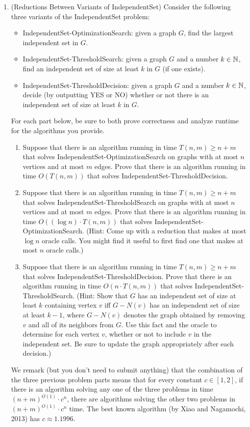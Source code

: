 \documentclass[11pt]{article}
\begin{document}
\begin{enumerate}
\begin{enumerate}
  \end{enumerate}

 \item (Reductions Between Variants of IndependentSet) 
 Consider the following three variants of the IndependentSet problem:
 \begin{itemize}
     \item IndependentSet-OptimizationSearch: given a graph $G$, find the largest independent set in $G$.
     \item IndependentSet-ThresholdSearch: given a graph $G$ and a number $k\in \mathbb{N}$, find an independent set of size at least $k$ in $G$ (if one exists).
     \item IndependentSet-ThresholdDecision: given a graph $G$ and a number $k\in \mathbb{N}$, decide (by outputting YES or NO) whether or not there is an independent set of size at least $k$ in $G$. 
 \end{itemize}
For each part below, be sure to both prove correctness and analyze runtime for the algorithms you provide.

 \begin{enumerate}
 \item Suppose that there is an algorithm running in time $T(n,m)\geq n+m$ that solves IndependentSet-OptimizationSearch on graphs with at most $n$ vertices and at most $m$ edges.  Prove that there is an algorithm running in time $O(T(n,m))$ that solves IndependentSet-ThresholdDecision. 
 \item Suppose that there is an algorithm running in time $T(n,m)\geq n+m$ that solves IndependentSet-ThresholdSearch on graphs with at most $n$ vertices and at most $m$ edges.  Prove that there is an algorithm running in time $O((\log n)\cdot T(n,m))$ that solves IndependentSet-OptimizationSearch.  (Hint: Come up with a reduction that makes at most $\log n$ oracle calls.  You might find it useful to first find one that makes at most $n$ oracle calls.)
  \item Suppose that there is an algorithm 
 running in time $T(n,m)\geq n+m$ that solves IndependentSet-ThresholdDecision.   Prove that there is an algorithm running in time $O(n\cdot T(n,m))$ that solves IndependentSet-ThresholdSearch.
(Hint: Show that $G$ has an independent set of size at least $k$ containing vertex $v$ iff $G-N(v)$ has an independent set of size at least $k-1$, where $G-N(v)$ denotes the graph obtained by removing $v$ and all of its neighbors from $G$.  Use this fact and the oracle to determine for each vertex $v$, whether or not to include $v$ in the independent set.  Be sure to update the graph appropriately after each decision.)
 \end{enumerate}
 We remark (but you don't need to submit anything) that the combination of the three previous problem parts means that for every constant $c\in [1,2]$, if there is an algorithm solving any one of the three problems in time $(n+m)^{O(1)}\cdot c^n$, there are algorithms solving the other two problems in $(n+m)^{O(1)}\cdot c^n$ time.  The best known algorithm (by Xiao and Nagamochi, 2013) has $c \approx 1.1996$.
 
\end{enumerate}
\end{document}
